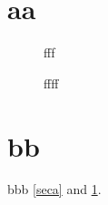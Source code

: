 \documentclass{article}
\begin{document}
\tableofcontents


\newpage
\section{aa\label{seca}}

\begin{figure}
fff
\caption{ffff\label{figa}}
\end{figure}

\newpage
\section{bb\label{secb}}
bbb \ref{seca} and \ref{figa}.
\end{document}
